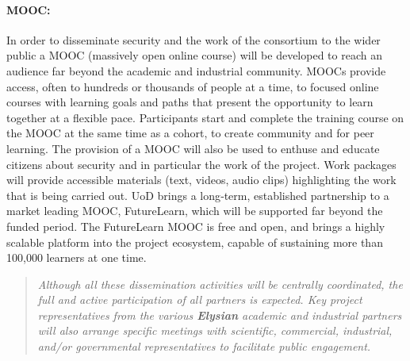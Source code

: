 \documentclass[a4paper,11pt]{article}
\newcommand{\project}[1]{\textbf{#1}\xspace}
\newcommand{\SECURITY}{\project{Elysian}}
\newcommand{\TheProject}{\SECURITY}
\begin{document}
 \paragraph{MOOC:}In order to disseminate security and the work of the consortium to the wider public a MOOC (massively open online course) will be developed to reach an audience far beyond the academic and industrial community.  MOOCs provide access, often to hundreds or thousands of people at a time, to focused online courses with learning goals and paths that present the opportunity to learn together at a flexible pace. Participants start and complete the training course on the MOOC at the same time as a cohort, to create community and for peer learning. The provision of a MOOC will also be
used to enthuse and educate citizens about security and in particular the work of the project.  Work packages will provide accessible materials (text, videos, audio clips) highlighting the work that is being carried out. UoD brings a long‐term, established partnership to a market leading MOOC, FutureLearn, which will be supported far beyond the funded period. The FutureLearn MOOC is free and open, and brings a highly scalable platform into the project ecosystem, capable of sustaining more than 100,000 learners at one time.


\begin{quote}

\emph{Although all these dissemination activities
will be centrally coordinated, the full and active participation of
all partners is expected. Key project representatives from
the various \TheProject{} academic and industrial
partners will also arrange specific meetings
with scientific, commercial, industrial, and/or
governmental representatives to facilitate public
engagement.}
\end{quote}
\end{document}
